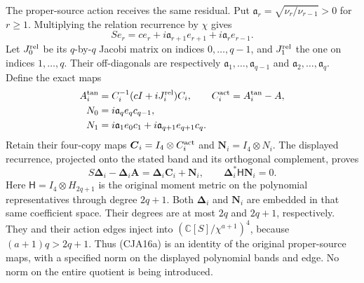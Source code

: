 \documentclass[11pt,a4paper]{article}
\begin{document}
The proper-source action receives the same residual.
Put \(\mathfrak a_r=\sqrt{\nu_r/\nu_{r-1}}>0\) for \(r\geq1\).
Multiplying the relation recurrence by \(\chi\) gives
\[
 Se_r=ce_r+i\mathfrak a_{r+1}e_{r+1}
                      +i\mathfrak a_re_{r-1}.
 \]
Let \(J_0^{\rm rel}\) be its \(q\)-by-\(q\) Jacobi matrix on
indices \(0,\ldots,q-1\), and \(J_1^{\rm rel}\) the one on
indices \(1,\ldots,q\).  Their off-diagonals are respectively
\(\mathfrak a_1,\ldots,\mathfrak a_{q-1}\) and
\(\mathfrak a_2,\ldots,\mathfrak a_q\).
Define the exact maps
\[
 \begin{split}
 A_i^{\rm tan}&=C_i^{-1}(cI+iJ_i^{\rm rel})C_i,\qquad
 C_i^{\rm act}=A_i^{\rm tan}-A,\\
 N_0&=i\mathfrak a_qe_qc_{q-1},\\
 N_1&=i\mathfrak a_1e_0c_1+
                         i\mathfrak a_{q+1}e_{q+1}c_q .
 \end{split}
 \]
Retain their four-copy maps
\(\boldsymbol C_i=I_4\otimes C_i^{\rm act}\) and
\(\boldsymbol N_i=I_4\otimes N_i\).
The displayed recurrence, projected onto the stated band and its
orthogonal complement, proves
\begin{equation}
 S\boldsymbol\Delta_i-\boldsymbol\Delta_i\mathbf A
    =\boldsymbol\Delta_i\boldsymbol C_i+\boldsymbol N_i,
 \qquad
 \boldsymbol\Delta_i^*\mathsf H\boldsymbol N_i=0.
 \tag{CJA16a}
\end{equation}
Here \(\mathsf H=I_4\otimes H_{2q+1}\) is the original moment
metric on the polynomial representatives through degree \(2q+1\).
Both \(\boldsymbol\Delta_i\) and \(\boldsymbol N_i\) are embedded
in that same coefficient space.
Their degrees are at most \(2q\) and \(2q+1\), respectively.
They and their action edges inject into
\((\mathbb C[S]/\chi^{a+1})^4\), because
\((a+1)q>2q+1\).
Thus (CJA16a) is an identity of the original proper-source maps,
with a specified norm on the displayed polynomial bands and edge.
No norm on the entire quotient is being introduced.
\end{document}

